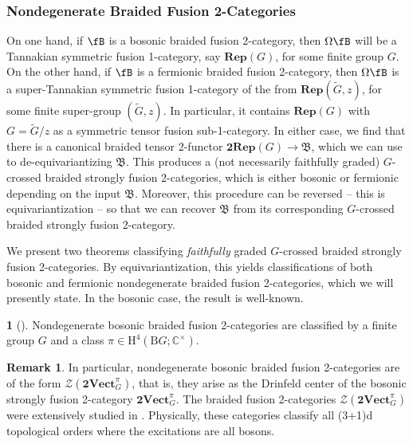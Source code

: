 \documentclass[11pt,reqno]{amsart}
\newcommand{\Rep}{\mathbf{Rep}}
\newcommand{\tVect}{\mathbf{2Vect}}
\newcommand{\rH}{\mathrm{H}}
\newcommand{\rB}{\mathrm{B}}
\numberwithin{equation}{section}
\theoremstyle{plain}
\theoremstyle{definition}
\newtheorem{rem}[equation]{Remark}
\newtheorem*{BosonicNondegen}{\Cref{BosonicNondegen}}
\begin{document}
\subsubsection{Nondegenerate Braided Fusion 2-Categories}\label{subsub:introNondegen}

On one hand, if $\fB$ is a bosonic braided fusion 2-category, then $\Omega \fB$ will be a Tannakian symmetric fusion 1-category, say $\mathbf{Rep}(G)$, for some finite group $G$. On the other hand, if $\fB$ is a fermionic braided fusion 2-category, then $\Omega \fB$ is a super-Tannakian symmetric fusion 1-category of the from $\Rep(\widetilde{G},z)$, for some finite super-group $(\widetilde{G},z)$. In particular, it contains $\Rep({G})$ with $G=\widetilde{G}/z$ as a symmetric tensor fusion sub-1-category. In either case, we find that there is a canonical braided tensor 2-functor $\mathbf{2Rep}({G})\rightarrow\mathfrak{B}$, which we can use to de-equivariantizing $\mathfrak{B}$. This produces a (not necessarily faithfully graded) $G$-crossed braided strongly fusion 2-categories, which is either bosonic or fermionic depending on the input $\mathfrak{B}$. Moreover, this procedure can be reversed -- this is equivariantization -- so that we can recover $\mathfrak{B}$ from its corresponding $G$-crossed braided strongly fusion 2-category.

We present two theorems classifying \textit{faithfully} graded $G$-crossed braided strongly fusion 2-categories. By equivariantization, this yields classifications of both bosonic and fermionic nondegenerate braided fusion 2-categories, which we will presently state. In the bosonic case, the result is well-known.

\begin{BosonicNondegen}[\cite{Lan_2018,JF}]\label{thm:nondegenBosonic}
    Nondegenerate bosonic braided fusion 2-categories are classified by a finite group $G$ and a class $\pi \in \rH^4(\rB G; \mathbb{C}^\times)$.
\end{BosonicNondegen}

\begin{rem}\label{rem:recoverBosonic}
    In particular, nondegenerate bosonic braided fusion 2-categories are of the form $\mathcal{Z}(\tVect_G^{\pi})$, that is, they arise as the Drinfeld center of the bosonic strongly fusion 2-category $\tVect_G^{\pi}$. The braided fusion 2-categories $\mathcal{Z}(\tVect_G^{\pi})$ were extensively studied in \cite{KTZ}. Physically, these categories classify all (3+1)d topological orders where the excitations are all bosons.
\end{rem}
\end{document}
